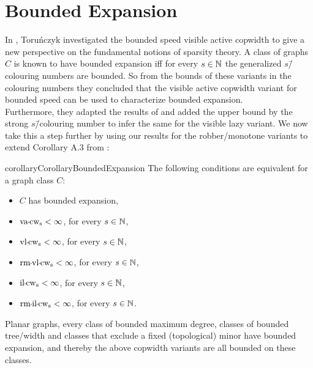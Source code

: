 \section{Bounded Expansion}
In \cite{torunczyk2023flip}, Toruńczyk investigated the bounded speed visible active copwidth to give a new perspective on the fundamental notions of sparsity theory. A class of graphs $C$ is known to have bounded expansion iff for every $s\in \mathbb{N}$ the generalized $s$\=/colouring numbers are bounded. So from the bounds of these variants in the colouring numbers they concluded that the visible active copwidth variant for bounded speed can be used to characterize bounded expansion. \\
Furthermore, they adapted the results of \cite{doi:10.1137/090780006} and added the upper bound by the strong $s$\=/colouring number to infer the same for the visible lazy variant. We now take this a step further by using our results for the robber\-/monotone variants to extend Corollary A.3 from \cite{torunczyk2023flip}:
\\
\begin{restatable}{corollary}{CorollaryBoundedExpansion}
        The following conditions are equivalent for a graph class $C$:
       \begin{itemize}
        \item $C$ has bounded expansion,
        \item $\vacopwidth{s}<\infty$, for every $s\in \mathbb{N}$,%
        \item $\vlcopwidth{s}<\infty$, for every $s\in \mathbb{N}$,%
        \item $\rmvlcopwidth{s}<\infty$, for every $s\in \mathbb{N}$,%
        \item $\ilcopwidth{s}<\infty$, for every $s\in \mathbb{N}$,%
        \item $\rmilcopwidth{s}<\infty$, for every $s\in \mathbb{N}$.%
    \end{itemize}
\end{restatable}
Planar graphs, every class of bounded maximum degree, classes of bounded tree\-/width and classes that exclude a fixed (topological) minor have bounded expansion, and thereby the above copwidth variants are all bounded on these classes.

